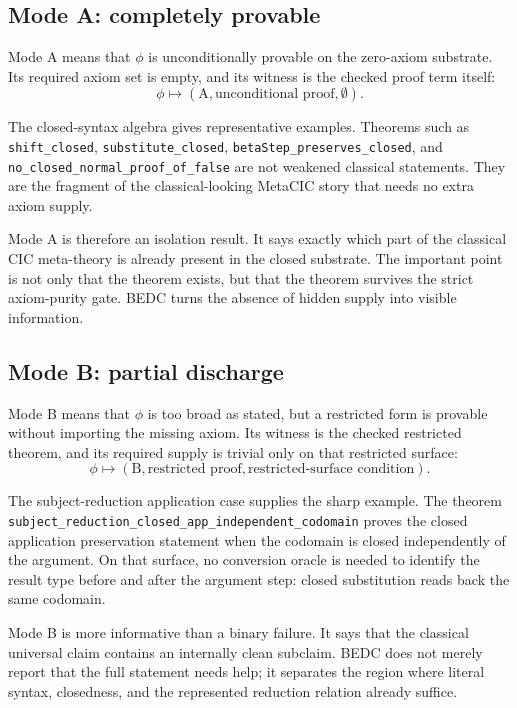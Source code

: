 \subsection{Mode A: completely provable}
\label{subsec:bedc-axiom-dependency-map-mode-a}

Mode A means that $\phi$ is unconditionally provable on the zero-axiom substrate. Its required axiom set is empty, and its witness is the checked proof term itself:
$$
\phi \mapsto
(\mathrm{A},\text{unconditional proof},\emptyset).
$$

The closed-syntax algebra gives representative examples. Theorems such as \texttt{shift\_closed}, \texttt{substitute\_closed}, \texttt{betaStep\_preserves\_closed}, and \texttt{no\_closed\_normal\_proof\_of\_false} are not weakened classical statements. They are the fragment of the classical-looking MetaCIC story that needs no extra axiom supply.

Mode A is therefore an isolation result. It says exactly which part of the classical CIC meta-theory is already present in the closed substrate. The important point is not only that the theorem exists, but that the theorem survives the strict axiom-purity gate. BEDC turns the absence of hidden supply into visible information.

\subsection{Mode B: partial discharge}
\label{subsec:bedc-axiom-dependency-map-mode-b}

Mode B means that $\phi$ is too broad as stated, but a restricted form is provable without importing the missing axiom. Its witness is the checked restricted theorem, and its required supply is trivial only on that restricted surface:
$$
\phi \mapsto
(\mathrm{B},\text{restricted proof},\text{restricted-surface condition}).
$$

The subject-reduction application case supplies the sharp example. The theorem \texttt{subject\_reduction\_closed\_app\_independent\_codomain} proves the closed application preservation statement when the codomain is closed independently of the argument. On that surface, no conversion oracle is needed to identify the result type before and after the argument step: closed substitution reads back the same codomain.

Mode B is more informative than a binary failure. It says that the classical universal claim contains an internally clean subclaim. BEDC does not merely report that the full statement needs help; it separates the region where literal syntax, closedness, and the represented reduction relation already suffice.

